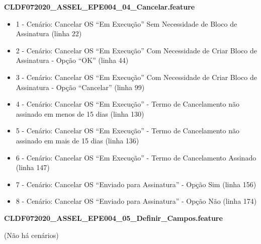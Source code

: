 \textbf{CLDF072020\_ASSEL\_EPE004\_04\_Cancelar.feature}
\begin{itemize}
	\item 1 - Cenário: Cancelar OS ``Em Execução'' Sem Necessidade de Bloco de Assinatura (linha 22)
	\item 2 - Cenário: Cancelar OS ``Em Execução'' Com Necessidade de Criar Bloco de Assinatura - Opção ``OK'' (linha 44)
	\item 3 - Cenário: Cancelar OS ``Em Execução'' Com Necessidade de Criar Bloco de Assinatura - Opção ``Cancelar'' (linha 99)
	\item 4 - Cenário: Cancelar OS ``Em Execução'' - Termo de Cancelamento não assinado em menos de 15 dias (linha 130)
	\item 5 - Cenário: Cancelar OS ``Em Execução'' - Termo de Cancelamento não assinado em mais de 15 dias (linha 136)
	\item 6 - Cenário: Cancelar OS ``Em Execução'' - Termo de Cancelamento Assinado (linha 147)
	\item 7 - Cenário: Cancelar OS ``Enviado para Assinatura'' - Opção Sim (linha 156)
	\item 8 - Cenário: Cancelar OS ``Enviado para Assinatura'' - Opção Não (linha 174)
\end{itemize}

\textbf{CLDF072020\_ASSEL\_EPE004\_05\_Definir\_Campos.feature}

(Não há cenários)


\newcommand{\sosFu}{CLDF072020\_ASSEL\_EPE004\_01\_Listar.feature}
\newcommand{\sosFuCu}{Cenário: Apresentar Unidades do Usuário (linha 27)}
\newcommand{\sosFuCd}{Cenário: Listar Solicitações da Unidade (linha 37)}
\newcommand{\sosFuCt}{Cenário: Listar Solicitações da Última Unidade Selecionada (linha 47)}
\newcommand{\sosFuCq}{Cenário: Listar Todos (linha 54)}
\newcommand{\sosFuCc}{Cenário: Ordenar (linha 58)}
\newcommand{\sosFuCs}{Cenário: Pesquisar Parcialmente Por Tipo de Dado (linha 62)}
\newcommand{\sosFuCe}{Cenário: Pesquisar Dado Inexistente (linha 71)}
\newcommand{\sosFuCo}{Cenário: Filtrar Status (linha 83)}
\newcommand{\sosFuCn}{Cenário: Apresentar Ações Desabilitadas (linha 90)}
\newcommand{\sosFuCuz}{Esquema do Cenário: Apresentar Código de Grupo 1 (linha 97)}
\newcommand{\sosFuCuu}{Esquema do Cenário: Apresentar Código de Grupo 2 - Minutas de Proposição (linha 110)}
\newcommand{\sosFuCud}{Esquema do Cenário: Apresentar Código de Grupo 3 - Minutas de Parecer (linha 128)}
\newcommand{\sosFuCut}{Cenário: Os Assinada (linha 161)}
\newcommand{\sosFuCuq}{Cenário: OS Não Assinada em menos de 15 dias (linha 178)}
\newcommand{\sosFuCuc}{Cenário: OS Não Assinada em mais que 15 dias (linha 190)}

